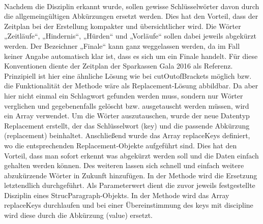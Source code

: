 {\\
Nachdem die Disziplin erkannt wurde, sollen gewisse Schlüsselwörter davon durch die allgemeingültigen Abkürzungen ersetzt werden. Dies hat den Vorteil, dass der Zeitplan bei der Erstellung kompakter und übersichtlicher wird. Die Wörter „Zeitläufe“, „Hindernis“, „Hürden“ und „Vorläufe“ sollen dabei jeweils abgekürzt werden. Der Bezeichner „Finale“ kann ganz weggelassen werden, da im Fall keiner Angabe automatisch klar ist, dass es sich um ein Finale handelt. Für diese Konventionen diente der Zeitplan der Sparkassen Gala 2016 als Referenz. Prinzipiell ist hier eine ähnliche Lösung wie bei cutOutofBrackets möglich bzw. die Funktionalität der Methode wäre als Replacement-Lösung abbildbar. Da aber hier nicht einmal ein Schlagwort gefunden werden muss, sondern nur Wörter verglichen und gegebenenfalls gelöscht bzw. ausgetauscht werden müssen, wird ein Array verwendet. Um die Wörter auszutauschen, wurde der neue Datentyp Replacement erstellt, der das Schlüsselwort (key) und die passende Abkürzung (replacement) beinhaltet. Anschließend wurde das Array replaceKeys definiert, wo die entsprechenden Replacement-Objekte aufgeführt sind. Dies hat den Vorteil, dass man sofort erkennt was abgekürzt werden soll und die Daten einfach gehalten werden können. Des weiteren lassen sich schnell und einfach weitere abzukürzende Wörter in Zukunft hinzufügen. In der Methode wird die Ersetzung letztendlich durchgeführt. Als Parameterwert dient die zuvor jeweils festgestellte Disziplin eines StrucParagraph-Objekts. In der Methode wird das Array replaceKeys durchlaufen und bei einer Übereinstimmung des keys mit discipline wird diese durch die Abkürzung (value) ersetzt.

}
